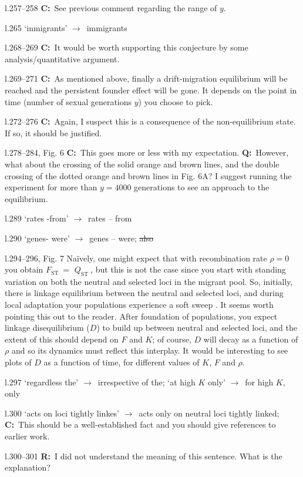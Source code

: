\documentclass[11pt]{article}
\newenvironment{my_description}
{\begin{description}
  \setlength{\itemsep}{2pt}
  \setlength{\parskip}{0pt}
  \setlength{\parsep}{0pt}}
{\end{description}}
\newcommand{\ra}{$\rightarrow$\ }
\newcommand{\C}{\textbf{C:}\ }
\newcommand{\Q}{\textbf{Q:}\ }
\newcommand{\R}{\textbf{R:}\ }
\newcommand{\fst}{$F_{\mathrm{ST}}\ $}
\newcommand{\qst}{$Q_{\mathrm{ST}}\ $}
\begin{document}
\begin{my_description}
	\item[l.257--258] \C See previous comment regarding the range of $y$.
	\item[l.265] `inmigrants' \ra immigrants
	\item[l.268--269] \C It would be worth supporting this conjecture by some analysis/quantitative argument.
	\item[l.269--271] \C As mentioned above, finally a drift-migration equilibrium will be reached and the persistent founder effect will be gone. It depends on the point in time (number of sexual generations $y$) you choose to pick.
	\item[l.272--276] \C Again, I suspect this is a consequence of the non-equilibrium state. If so, it should be justified.
	\item[l.278--284, Fig. 6] \C This goes more or less with my expectation. \Q However, what about the crossing of the solid orange and brown lines, and the double crossing of the dotted orange and brown lines in Fig. 6A? I suggest running the experiment for more than $y=4000$ generations to see an approach to the equilibrium.
	\item[l.289] `rates -from' \ra rates -- from
	\item[l.290] `genes- were' \ra genes -- were; \sout{also}
	\item[l.294--296, Fig. 7] Na\"ively, one might expect that with recombination rate $\rho = 0$ you obtain \fst$=$ \qst, but this is not the case since you start with standing variation on both the neutral and selected loci in the migrant pool. So, initially, there is linkage equilibrium between the neutral and selected loci, and during local adaptation your populations experience a soft sweep \citep{Hermisson:2005uq}. It seems worth pointing this out to the reader. After foundation of populations, you expect linkage disequilibrium ($D$) to build up between neutral and selected loci, and the extent of this should depend on $F$ and $K$; of course, $D$ will decay as a function of $\rho$ and so its dynamics must reflect this interplay. It would be interesting to see plots of $D$ as a function of time, for different values of $K$, $F$ and $\rho$.
	\item[l.297] `regardless the' \ra irrespective of the; `at high $K$ only' \ra for high $K$, only
	\item[l.300] `acts on loci tightly linkes' \ra acts only on neutral loci tightly linked; \C This should be a well-established fact and you should give references to earlier work.
	\item[l.300--301] \R I did not understand the meaning of this sentence. What is the explanation?

\end{my_description}
\end{document}
